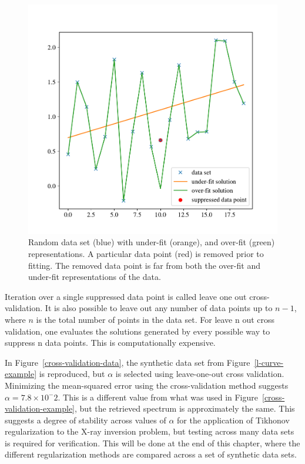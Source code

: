 \begin{figure}[p]
    \centering
    \includegraphics[width=1.0\textwidth]{figures/chapter_4/cross_validation_motivation/cross_validation_motivation.pdf}
    \caption{Random data set (blue) with under-fit (orange), and over-fit (green) representations. A particular data point (red) is removed prior to fitting. The removed data point is far from both the over-fit and under-fit representations of the data. }
    \label{cross_validation_motivation}
\end{figure}

Iteration over a single suppressed data point is called leave one out cross-validation. It is also possible to leave out any number of data points up to $n-1$, where $n$ is the total number of points in the data set. For leave n out cross validation, one evaluates the solutions generated by every possible way to suppress n data points. This is computationally expensive. 

In Figure~\ref{cross-validation-data}, the synthetic data set from Figure~\ref{l-curve-example} is reproduced, but $\alpha$ is selected using leave-one-out cross validation. Minimizing the mean-squared error using the cross-validation method suggests $\alpha=7.8\times10^-2.$ This is a different value from what was used in Figure~\ref{cross-validation-example}, but the retrieved spectrum is approximately the same. This suggests a degree of stability across values of $\alpha$ for the application of Tikhonov regularization to the X-ray inversion problem, but testing across many data sets is required for verification. This will be done at the end of this chapter, where the different regularization methods are compared across a set of synthetic data sets. 

